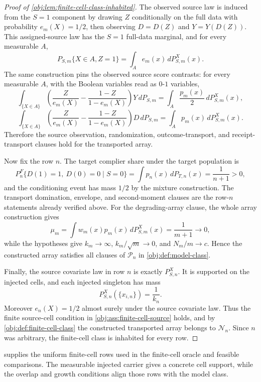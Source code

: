 \documentclass[11pt]{article}
\begin{document}
\begin{proof}[Proof of \cref{obj:lem:finite-cell-class-inhabited}]
The observed source law is induced from the \(S=1\) component by drawing
\(Z\) conditionally on the full data with probability \(e_m(X)=1/2\), then
observing \(D=D(Z)\) and \(Y=Y(D(Z))\).  This assigned-source law has the
\(S=1\) full-data marginal, and for every measurable \(A\),
\[
P_{S,m}\{X\in A, Z=1\}
=
\int_A e_m(x)\,dP_{S,m}^X(x).
\]
The same construction pins the observed source score contrasts: for every
measurable \(A\), with the Boolean variables read as \(0\)-\(1\) variables,
\[
\int_{\{X\in A\}}
\left(\frac{Z}{e_m(X)}-\frac{1-Z}{1-e_m(X)}\right)Y\,dP_{S,m}
=
\int_A \frac{p_m(x)}2\,dP_{S,m}^X(x),
\]
\[
\int_{\{X\in A\}}
\left(\frac{Z}{e_m(X)}-\frac{1-Z}{1-e_m(X)}\right)D\,dP_{S,m}
=
\int_A p_m(x)\,dP_{S,m}^X(x).
\]
Therefore the source observation, randomization, outcome-transport, and
receipt-transport clauses hold for the transported array. %

Now fix the row \(n\).  The target complier share under the target population is
\[
P_n^F\{D(1)=1,\ D(0)=0\mid S=0\}
=
\int p_n(x)\,dP_{T,n}(x)
=
\frac1{n+1}
>
0,
\]
and the conditioning event has mass \(1/2\) by the mixture construction.  The
transport domination, envelope, and second-moment clauses are the row-\(n\)
statements already verified above.  For the degrading-array clause, the whole
array construction gives
\[
\mu_m
=
\int w_m(x)p_m(x)\,dP_{S,m}^X(x)
=
\frac1{m+1}
\longrightarrow0,
\]
while the hypotheses give \(k_m\to\infty\), \(k_m/\sqrt m\to0\), and
\(N_m/m\to c\).  Hence the constructed array satisfies all clauses of
\(\mathcal P_n\) in \cref{obj:def:model-class}. %

Finally, the source covariate law in row \(n\) is exactly \(P_{S,n}^X\).  It is
supported on the injected cells, and each injected singleton has mass
\[
P_{S,n}^X(\{x_{i,n}\})=\frac1{k_n}.
\]
Moreover \(e_n(X)=1/2\) almost surely under the source covariate law.  Thus the
finite source-cell condition in \cref{obj:ass:finite-cell-source} holds, and by
\cref{obj:def:finite-cell-class} the constructed transported array belongs to
\(\mathcal N_n\).  Since \(n\) was arbitrary, the finite-cell class is inhabited
for every row. %
\end{proof}

 supplies the uniform finite-cell rows used in the finite-cell oracle and feasible comparisons. The measurable injected carrier gives a concrete cell support, while the overlap and growth conditions align those rows with the model class.
\end{document}
